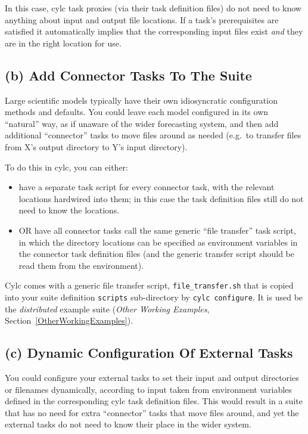 \documentclass[11pt,a4paper]{article}
\begin{document}
In this case, cylc task proxies (via their task definition files) do not
need to know anything about input and output file locations. If a task's
prerequisites are satisfied it automatically implies that the
corresponding input files exist {\em and} they are in the right location
for use.

\subsection{(b) Add Connector Tasks To The Suite} 

Large scientific models typically have their own idiosyncratic
configuration methods and defaults. You could leave each model
configured in its own ``natural'' way, as if unaware of the wider
forecasting system, and then add additional ``connector'' tasks to move
files around as needed (e.g.\ to transfer files from X's output
directory to Y's input directory).

To do this in cylc, you can either:

\begin{itemize}
    \item have a separate task script for every connector task, with the
        relevant locations hardwired into them; in this case the task
        definition files still do not need to know the locations.
    \item OR have all connector tasks call the same generic ``file
        transfer'' task script, in which the directory locations can be
        specified as environment variables in the connector task
        definition files (and the generic transfer script should be read
        them from the environment).
\end{itemize}

Cylc comes with a generic file transfer script, \lstinline=file_transfer.sh= that
is copied into your suite definition \lstinline=scripts= sub-directory 
by \lstinline=cylc configure=. It is used be the {\em distributed}
example suite ({\em Other Working Examples}, Section~\ref{OtherWorkingExamples}).

\subsection{(c) Dynamic Configuration Of External Tasks}

You could configure your external tasks to set their input and output
directories or filenames dynamically, according to input taken from
environment variables defined in the corresponding cylc task definition
files. This would result in a suite that has no need for extra
``connector'' tasks that move files around, and yet the external tasks
do not need to know their place in the wider system.
\end{document}
